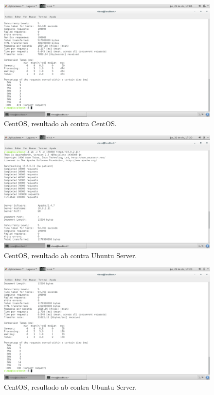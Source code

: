 \begin{figure}[H] 
	\centering
	\includegraphics[width=14.7cm]{./img/ejercicio3_5.png} 	
	\caption{CentOS, resultado ab contra CentOS.} \label{fig:ejercicio3_5}
\end{figure}

\begin{figure}[H] 
	\centering
	\includegraphics[width=14.7cm]{./img/ejercicio3_6.png} 	
	\caption{CentOS, resultado ab contra Ubuntu Server.} \label{fig:ejercicio3_6}
\end{figure}

\begin{figure}[H] 
	\centering
	\includegraphics[width=14.7cm]{./img/ejercicio3_7.png} 	
	\caption{CentOS, resultado ab contra Ubuntu Server.} \label{fig:ejercicio3_7}
\end{figure}



